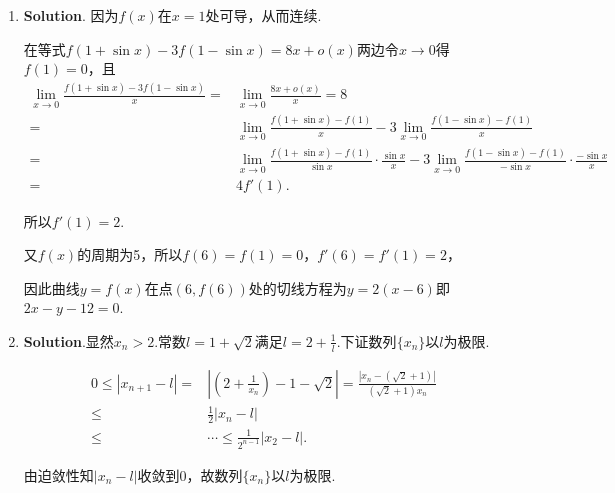 \documentclass[../Main.tex]{subfiles}
\begin{document}
\begin{enumerate}
          当$x\to0$时，$\ln(1+x)\to0$，所以由夹逼准则可知$\xi\to0$.

          同时，$\frac{\xi}{x}$介于$1$与$\frac{\ln(1+x)}{x}$之间，显然$\lim_{x\to0}\frac{\xi}{x}
              =1$.故
          \[
              \begin{aligned}
                  \lim_{x\to0}\frac{f'(\xi)-f'(0)}{\xi-0}\cdot\frac{\xi}{x}\cdot\frac{x-\ln(1+x)}{x^2} & =f''(0)\cdot\frac{x-\left(x-\frac{x^2}{2}+o(x^2)\right)}{x^2} \\
                                                                                                       & =\frac{f''(0)}{2}.
              \end{aligned}
          \]

    \item \textbf{Solution}. 因为$f(x)$在$x=1$处可导，从而连续.

          在等式$f(1+\sin x)-3f(1-\sin x)=8x+o(x)$两边令$x\to0$得$f(1)=0$，且
          \[
              \begin{aligned}
                  \lim_{x\to0}\frac{f(1+\sin x)-3f(1-\sin x)}{x}= & \lim_{x\to0}\frac{8x+o(x)}{x}=8                                                                                                      \\
                  =                                               & \lim_{x\to0}\frac{f(1+\sin x)-f(1)}{x}-3\lim_{x\to0}\frac{f(1-\sin x)-f(1)}{x}                                                       \\
                  =                                               & \lim_{x\to0}\frac{f(1+\sin x)-f(1)}{\sin x}\cdot\frac{\sin x}{x}-3\lim_{x\to0}\frac{f(1-\sin x)-f(1)}{-\sin x}\cdot\frac{-\sin x}{x} \\
                  =                                               & 4f'(1).
              \end{aligned}
          \]

          所以$f'(1)=2$.

          又$f(x)$的周期为5，所以$f(6)=f(1)=0$，$f'(6)=f'(1)=2$，

          因此曲线$y=f(x)$在点$(6,f(6))$处的切线方程为$y=2(x-6)$即$2x-y-12=0$.

    \item \textbf{Solution}.显然$x_{n}>2$.常数$l=1+\sqrt{2}$满足$l=2+\frac{1}{l}$.下证数列$\{
              x_{n}\}$以$l$为极限.

          \[
              \begin{aligned}
                  0\leq|x_{n+1}-l|= & \left|\left(2+\frac{1}{x_n}\right)-1-\sqrt{2}\right|=\frac{\left|x_n-\left(\sqrt{2}+1\right)\right|}{\left(\sqrt{2}+1\right)x_n} \\
                  \leq              & \frac{1}{2}|x_{n}-l|                                                                                                             \\
                  \leq              & \cdots \leq \frac{1}{2^{n-1}}|x_{2}-l|.
              \end{aligned}
          \]

          由迫敛性知$|x_{n}-l|$收敛到$0$，故数列$\{x_{n}\}$以$l$为极限.
\end{enumerate}
\end{document}
